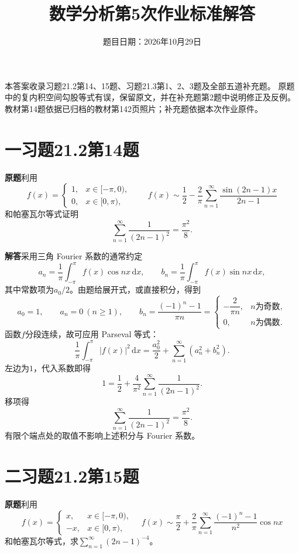 \documentclass[11pt,a4paper]{ctexart}
\title{数学分析第5次作业标准解答}
\author{}
\date{题目日期：2026年10月29日}
\newcommand{\dd}{\,\mathrm d}
\newcommand{\problem}{\par\textbf{原题}\quad}
\newcommand{\solution}{\par\medskip\textbf{解答}\quad}
\begin{document}
\maketitle
\vspace{-2em}
本答案收录习题21.2第14、15题、习题21.3第1、2、3题及全部五道补充题。
原题中的复内积空间勾股等式有误，保留原文，并在补充题第2题中说明修正及反例。
教材第14题依据已归档的教材第142页照片；补充题依据本次作业原件。

\section*{一\quad 习题21.2第14题}
\problem 利用
\[
 f(x)=
 \begin{cases}
  1,&x\in[-\pi,0),\\
  0,&x\in[0,\pi),
 \end{cases}
 \qquad
 f(x)\sim\frac12-\frac2\pi
       \sum_{n=1}^{\infty}\frac{\sin(2n-1)x}{2n-1}
\]
和帕塞瓦尔等式证明
\[
 \sum_{n=1}^{\infty}\frac1{(2n-1)^2}=\frac{\pi^2}{8}.
\]

\solution 采用三角 Fourier 系数的通常约定
\[
 a_n=\frac1\pi\int_{-\pi}^{\pi}f(x)\cos nx\dd x,\qquad
 b_n=\frac1\pi\int_{-\pi}^{\pi}f(x)\sin nx\dd x,
\]
其中常数项为$a_0/2$。由题给展开式，或直接积分，得到
\[
 a_0=1,\qquad a_n=0\ (n\ge1),\qquad
 b_n=\frac{(-1)^n-1}{\pi n}
 =
 \begin{cases}
 -\dfrac2{\pi n},&n\text{为奇数},\\
 0,&n\text{为偶数}.
 \end{cases}
\]
函数$f$分段连续，故可应用 Parseval 等式：
\[
 \frac1\pi\int_{-\pi}^{\pi}|f(x)|^2\dd x
 =\frac{a_0^2}{2}+\sum_{n=1}^{\infty}(a_n^2+b_n^2).
\]
左边为$1$，代入系数即得
\[
 1=\frac12+\frac4{\pi^2}
              \sum_{n=1}^{\infty}\frac1{(2n-1)^2}.
\]
移项得
\[
 \boxed{\displaystyle\sum_{n=1}^{\infty}\frac1{(2n-1)^2}
                  =\frac{\pi^2}{8}.}
\]
有限个端点处的取值不影响上述积分与 Fourier 系数。

\newpage
\section*{二\quad 习题21.2第15题}
\problem 利用
\[
f(x)=\begin{cases}x,&x\in[-\pi,0),\\-x,&x\in[0,\pi),\end{cases}
\quad f(x)\sim\frac\pi2+\frac2\pi\sum_{n=1}^{\infty}
\frac{(-1)^n-1}{n^2}\cos nx
\]
和帕塞瓦尔等式，求$\displaystyle\sum_{n=1}^{\infty}(2n-1)^{-4}$。
\end{document}
